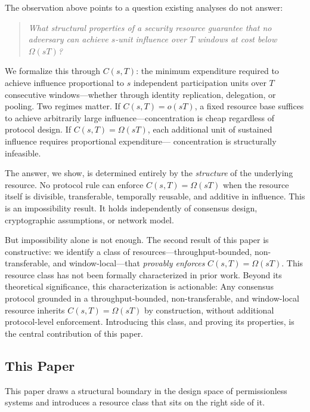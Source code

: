 \documentclass[10pt,journal,compsoc]{IEEEtran}
\theoremstyle{remark}
\begin{document}
	The observation above points to a question existing
	analyses do not answer:
	
	\begin{quote}
		\emph{What structural properties of a security resource
			guarantee that no adversary can achieve $s$-unit influence
			over $T$ windows at cost below $\Omega(sT)$?}
	\end{quote}
	
	We formalize this through $C(s,T)$: the minimum
	expenditure required to achieve influence proportional
	to $s$ independent participation units over $T$
	consecutive windows---whether through identity
	replication, delegation, or pooling.
	Two regimes matter.
	If $C(s,T) = o(sT)$, a fixed resource base suffices
	to achieve arbitrarily large influence---concentration
	is cheap regardless of protocol design.
	If $C(s,T) = \Omega(sT)$, each additional unit of
	sustained influence requires proportional expenditure---
	concentration is structurally infeasible.
	
	The answer, we show, is determined entirely by the
	\emph{structure} of the underlying resource.
	No protocol rule can enforce $C(s,T) = \Omega(sT)$
	when the resource itself is divisible, transferable,
	temporally reusable, and additive in influence.
	This is an impossibility result.
	It holds independently of consensus design, cryptographic
	assumptions, or network model.
	
	But impossibility alone is not enough.
	The second result of this paper is constructive:
	we identify a class of resources---throughput-bounded,
	non-transferable, and window-local---that
	\emph{provably enforces} $C(s,T) = \Omega(sT)$.
	This resource class has not been formally characterized
	in prior work.
	Beyond its theoretical significance, this characterization
	is actionable: Any consensus protocol grounded in a throughput-bounded,
	non-transferable, and window-local resource inherits
	$C(s,T) = \Omega(sT)$ by construction, without additional protocol-level
	enforcement.
	Introducing this class, and proving its properties,
	is the central contribution of this paper.
	
	\subsection{This Paper}
	\label{ssec:thispaper}
	
	This paper draws a structural boundary in the design space
	of permissionless systems and introduces a resource class
	that sits on the right side of it.
	
\end{document}
